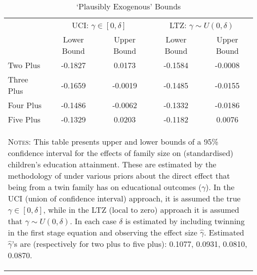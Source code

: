 \begin{table}[htpb!]\caption{`Plausibly Exogenous' Bounds} 
\label{TWINtab:Conley}\begin{center}\begin{tabular}{lcccc}
\toprule \toprule 
&\multicolumn{2}{c}{UCI: $\gamma\in [0,\delta]$}&\multicolumn{2}{c}{LTZ: $\gamma \sim U(0,\delta)$}\\ 
\cmidrule(r){2-3} \cmidrule(r){4-5}
&Lower Bound&Upper Bound&Lower Bound&Upper Bound\\
Two Plus&-0.1827&0.0173&-0.1584&-0.0008\\
Three Plus&-0.1659&-0.0019&-0.1485&-0.0155\\
Four Plus&-0.1486&-0.0062&-0.1332&-0.0186\\
Five Plus&-0.1329&0.0203&-0.1182&0.0076\\
\midrule\multicolumn{5}{p{11.6cm}}{\begin{footnotesize}\textsc{Notes:} This table presents upper and lower bounds of a 95\% confidence interval for the effects of family size on (standardised) children's education attainment. These are estimated by the methodology of \citet{Conleyetal2012}  under various priors about the direct effect that being from a twin family has on educational outcomes ($\gamma$). In the UCI (union of confidence interval) approach, it is assumed the true $\gamma\in[0,\delta]$, while in the LTZ (local to zero) approach it is assumed that $\gamma\sim U(0,\delta)$.  In each case $\delta$ is estimated by including twinning in the first stage  equation and observing the effect size $\hat\gamma$.  Estimated $\hat\gamma$'s are (respectively for two plus to five plus):   0.1077, 0.0931, 0.0810, 0.0870.\end{footnotesize}}  
\\ \bottomrule \end{tabular}\end{center}\end{table} 
